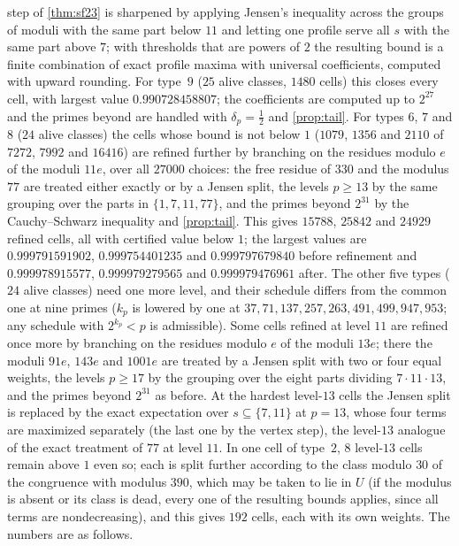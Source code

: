 step of \cref{thm:sf23} is sharpened by applying Jensen's inequality across the groups of moduli with the same part
below $11$ and letting one profile serve all $s$ with the same part above $7$; with thresholds that are powers of
$2$ the resulting bound is a finite combination of exact profile maxima with universal coefficients, computed with
upward rounding. For type~$9$ ($25$ alive classes, $1480$ cells) this closes every cell, with largest value
$0.990728458807$; the coefficients are computed up to $2^{27}$ and the primes beyond are handled with
$\delta_p=\frac12$ and \cref{prop:tail}. For types $6$, $7$ and $8$ ($24$ alive classes) the cells whose bound is
not below $1$ ($1079$, $1356$ and $2110$ of $7272$, $7992$ and $16416$) are refined further by branching on the
residues modulo $e$ of the moduli $11e$, over all $27000$ choices: the free residue of $330$ and the modulus $77$
are treated either exactly or by a Jensen split, the levels $p\ge13$ by the same grouping over the parts in
$\{1,7,11,77\}$, and the primes beyond $2^{31}$ by the Cauchy--Schwarz inequality and \cref{prop:tail}. This
gives $15788$, $25842$ and $24929$ refined cells, all with certified value below $1$; the largest values are
$0.999791591902$, $0.999754401235$ and $0.999797679840$ before refinement and $0.999978915577$, $0.999979279565$
and $0.999979476961$ after. The other five types ($24$ alive classes) need one more level, and their schedule
differs from the common one at nine primes ($k_p$ is lowered by one at $37,71,137,257,263,491,499,947,953$; any
schedule with $2^{k_p}<p$ is admissible). Some cells refined at level $11$ are refined once more by branching on
the residues modulo $e$ of the moduli $13e$; there the moduli $91e$, $143e$ and $1001e$ are treated by a Jensen
split with two or four equal weights, the levels $p\ge17$ by the grouping over the eight parts dividing
$7\cdot11\cdot13$, and the primes beyond $2^{31}$ as before. At the hardest level-$13$ cells the Jensen split is
replaced by the exact expectation over $s\subseteq\{7,11\}$ at $p=13$, whose four terms are maximized separately
(the last one by the vertex step), the level-$13$ analogue of the exact treatment of $77$ at level $11$. In one cell
of type~$2$, $8$ level-$13$ cells remain above $1$ even so; each is split further according to the class modulo
$30$ of the congruence with modulus $390$, which may be taken to lie in $U$ (if the modulus is absent or its class is
dead, every one of the resulting bounds applies, since all terms are nondecreasing), and this gives $192$ cells, each
with its own weights. The numbers are as follows.
